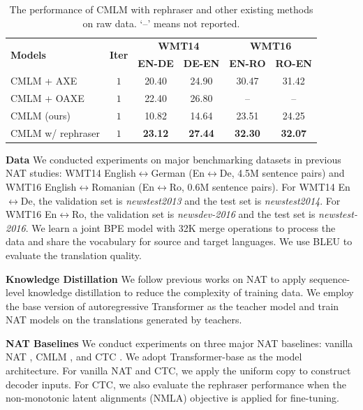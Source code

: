 \documentclass[letterpaper]{article} %
\begin{document}
\begin{table}[h]
\centering
\small
\begin{tabular}{lccccc}
\toprule
 \multirow{2}{*}{\textbf{Models}} & \multirow{2}{*}{\textbf{Iter}} &
 \multicolumn{2}{c}{\textbf{WMT14}} & \multicolumn{2}{c}{\textbf{WMT16}} \\
  &&\textbf{EN-DE} & \textbf{DE-EN} & \textbf{EN-RO} & \textbf{RO-EN} \\
\midrule
CMLM + AXE \cite{Aligned} &$1$& 20.40 & 24.90 & 30.47 & 31.42 \\
CMLM + OAXE \cite{DBLP:conf/icml/DuTJ21} &$1$&22.40 & 26.80 & -- & --\\
CMLM (ours) &$1$& 10.82& 14.64&23.51 &24.25 \\
CMLM w/ rephraser &$1$&\bf{23.12} &\bf{27.44}& \bf{32.30}&\bf{32.07} \\
\bottomrule
\end{tabular}
\caption{The performance of CMLM with rephraser and other existing methods on raw data. `--' means not reported.}
\label{tab:raw}
\end{table}
\noindent{}\textbf{Data} We conducted experiments on major benchmarking datasets in previous NAT studies: WMT14 English$\leftrightarrow$German (En$\leftrightarrow$De, 4.5M sentence pairs) and WMT16 English$\leftrightarrow$Romanian (En$\leftrightarrow$Ro, 0.6M sentence pairs). For WMT14 En$\leftrightarrow$De, the validation set is \textit{newstest2013} and the test set is \textit{newstest2014}. For WMT16 En$\leftrightarrow$Ro, the validation set is \textit{newsdev-2016} and the test set is \textit{newstest-2016}. We learn a joint BPE model \cite{sennrich2015neural} with 32K merge operations to process the data and share the vocabulary for source and target languages. We use BLEU \cite{papineni2002bleu} to evaluate the translation quality. 

\vspace{5pt}
\noindent{}\textbf{Knowledge Distillation} We follow previous works on NAT to apply sequence-level knowledge distillation \cite{kim-rush-2016-sequence} to reduce the complexity of training data. We employ the base version of autoregressive Transformer \cite{vaswani2017attention} as the teacher model and train NAT models on the translations generated by teachers.

\vspace{5pt}
\noindent{}\textbf{NAT Baselines} We conduct experiments on three major NAT baselines: vanilla NAT \cite{gu2017non}, CMLM \cite{ghazvininejad2019maskpredict}, and CTC \cite{libovicky2018end}. We adopt Transformer-base as the model architecture. For vanilla NAT and CTC, we apply the uniform copy \cite{gu2017non} to construct decoder inputs. For CTC, we also evaluate the rephraser performance when the non-monotonic latent alignments (NMLA) objective \cite{nmla} is applied for fine-tuning.
\end{document}
